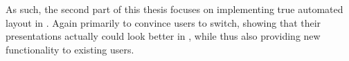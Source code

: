   As such, the second part of this thesis focuses on implementing true
  automated layout in \mxp. Again primarily to convince \ppt* users to switch,
  showing that their presentations actually could look better in \mxp, while
  thus also providing new functionality to existing \mxp users.

